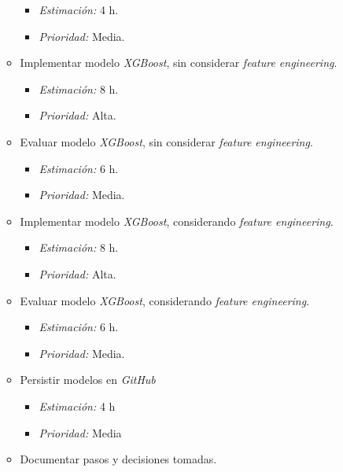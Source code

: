 \documentclass[
11pt, %
]{charter}
\begin{document}
\begin{itemize}
\begin{itemize}
\begin{itemize}
                    \item \textit{Estimación:} 4 h.
                    \item \textit{Prioridad:} Media.
                \end{itemize}
            \item Implementar modelo \textit{XGBoost}, sin considerar \textit{feature engineering}.
                \begin{itemize}
                    \item \textit{Estimación:} 8 h.
                    \item \textit{Prioridad:} Alta.
                \end{itemize}
            \item Evaluar modelo \textit{XGBoost}, sin considerar \textit{feature engineering}.
                \begin{itemize}
                    \item \textit{Estimación:} 6 h.
                    \item \textit{Prioridad:} Media.
                \end{itemize}
            \item Implementar modelo \textit{XGBoost}, considerando \textit{feature engineering}.
                \begin{itemize}
                    \item \textit{Estimación:} 8 h.
                    \item \textit{Prioridad:} Alta.
                \end{itemize}
            \item Evaluar modelo \textit{XGBoost}, considerando \textit{feature engineering}.
                \begin{itemize}
                    \item \textit{Estimación:} 6 h.
                    \item \textit{Prioridad:} Media.
                \end{itemize}
            \item Persistir modelos en \textit{GitHub}
                \begin{itemize}
                    \item \textit{Estimación:} 4 h
                    \item \textit{Prioridad:} Media
                \end{itemize}
            \item Documentar pasos y decisiones tomadas.

\end{itemize}
\end{itemize}
\end{document}

